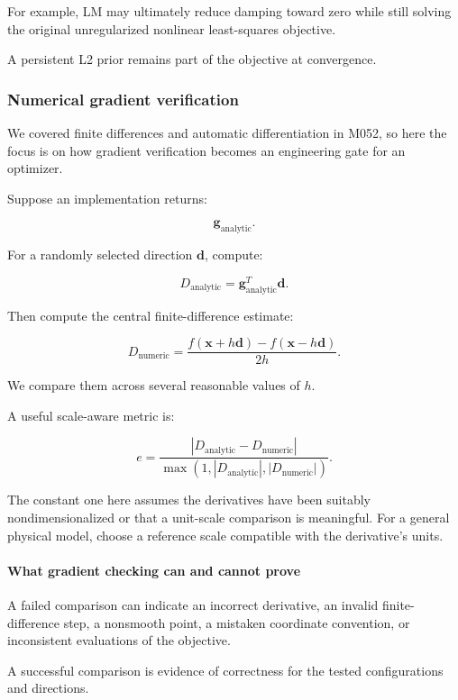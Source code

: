 For example, LM may ultimately reduce damping toward zero while still solving the original unregularized nonlinear least-squares objective.

A persistent L2 prior remains part of the objective at convergence.

\subsubsection{Numerical gradient verification}\label{02-foundations-ii-ch027-numerical-gradient-verification}

We covered finite differences and automatic differentiation in M052, so here the focus is on how gradient verification becomes an engineering gate for an optimizer.

Suppose an implementation returns:

\[
\mathbf g_{\mathrm{analytic}}.
\]

For a randomly selected direction \(\mathbf d\), compute:

\[
D_{\mathrm{analytic}} = \mathbf g_{\mathrm{analytic}}^T\mathbf d.
\]

Then compute the central finite-difference estimate:

\[
D_{\mathrm{numeric}} = \frac{ f(\mathbf x+h\mathbf d) - f(\mathbf x-h\mathbf d) }{2h}.
\]

We compare them across several reasonable values of \(h\).

A useful scale-aware metric is:

\[
\boxed{ e= \frac{ |D_{\mathrm{analytic}}-D_{\mathrm{numeric}}| }{ \max(1,|D_{\mathrm{analytic}}|,|D_{\mathrm{numeric}}|) } }.
\]

The constant one here assumes the derivatives have been suitably nondimensionalized or that a unit-scale comparison is meaningful. For a general physical model, choose a reference scale compatible with the derivative's units.

\paragraph{What gradient checking can and cannot prove}\label{02-foundations-ii-ch027-what-gradient-checking-can-and-cannot-prove}

A failed comparison can indicate an incorrect derivative, an invalid finite-difference step, a nonsmooth point, a mistaken coordinate convention, or inconsistent evaluations of the objective.

A successful comparison is evidence of correctness for the tested configurations and directions.


